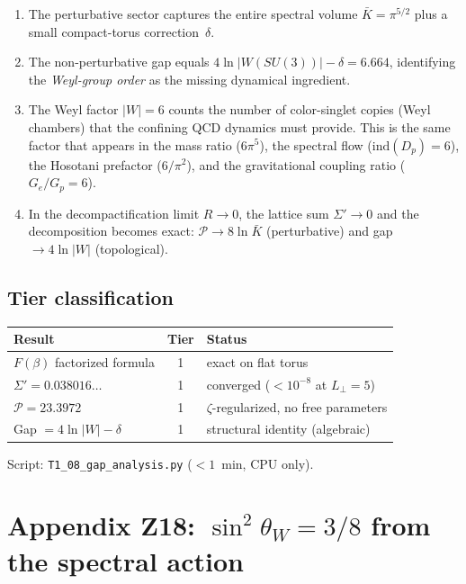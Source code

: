 \documentclass[11pt,a4paper]{article}
\begin{document}
\begin{enumerate}[nosep]
\item The perturbative sector captures the entire spectral volume
  $\bar K=\pi^{5/2}$ plus a small compact-torus correction~$\delta$.
\item The non-perturbative gap equals $4\ln|W(SU(3))|-\delta=6.664$,
  identifying the \emph{Weyl-group order} as the missing dynamical
  ingredient.
\item The Weyl factor $|W|=6$ counts the number of color-singlet
  copies (Weyl chambers) that the confining QCD dynamics must provide.
  This is the same factor that appears in the mass ratio ($6\pi^5$),
  the spectral flow ($\mathrm{ind}(D_p)=6$), the Hosotani prefactor
  ($6/\pi^2$), and the gravitational coupling ratio ($G_e/G_p=6$).
\item In the decompactification limit $R\to 0$, the lattice sum
  $\Sigma'\to 0$ and the decomposition becomes exact:
  $\mathcal{P}\to 8\ln\bar K$ (perturbative) and
  gap~$\to 4\ln|W|$ (topological).
\end{enumerate}

\subsection{Tier classification}

\begin{center}\small
\renewcommand{\arraystretch}{1.1}
\begin{tabular}{lcp{5cm}}
\toprule
\textbf{Result} & \textbf{Tier} & \textbf{Status}\\
\midrule
$F(\beta)$ factorized formula & 1 & exact on flat torus \\
$\Sigma'=0.038016\ldots$ & 1 & converged ($<10^{-8}$ at $L_\perp=5$) \\
$\mathcal{P}=23.3972$ & 1 & $\zeta$-regularized, no free parameters \\
Gap $=4\ln|W|-\delta$ & 1 & structural identity (algebraic) \\
\bottomrule
\end{tabular}
\end{center}

Script: \texttt{T1\_08\_gap\_analysis.py} ($<1$~min, CPU only).

\section{Appendix Z18: $\sin^2\theta_W=3/8$ from the spectral action}
\label{app:weinberg}
\end{document}
